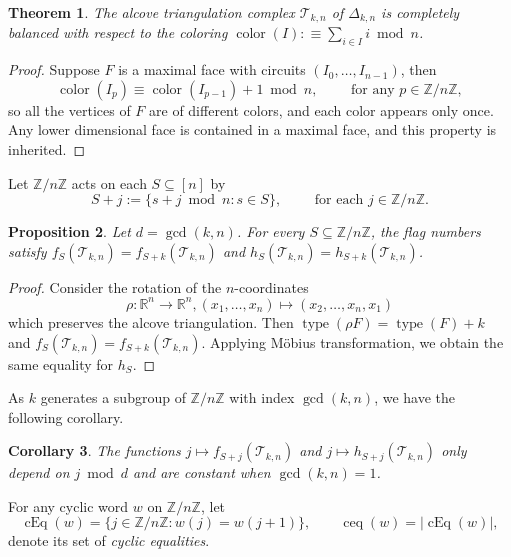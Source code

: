 \documentclass[10pt,a4paper]{amsart}
\theoremstyle{plain}
\newtheorem{theorem}{Theorem}[section]
\newtheorem{proposition}[theorem]{Proposition}
\newtheorem{corollary}[theorem]{Corollary}
\theoremstyle{definition}
\newcommand{\Z}{\mathbb{Z}}
\newcommand{\R}{\mathbb{R}}
\newcommand{\hyp}{\Delta_{k,n}}
\newcommand{\Tri}{\mathcal{T}_{k,n}}
\DeclareMathOperator{\typ}{type}
\DeclareMathOperator{\cEq}{cEq}
\DeclareMathOperator{\col}{color}
\DeclareMathOperator{\ceq}{ceq}
\begin{document}
\begin{theorem}\label{thm:coloring}
	The alcove triangulation complex $ \Tri $ of $ \hyp $
	is completely balanced with respect to the coloring $
		\col(I):\equiv \sum_{i \in I} i \bmod n$.
\end{theorem}

\begin{proof}
	Suppose $F$ is a maximal face with circuits $(I_0,\dots,I_{n-1})$, then \[\col(I_{p}) \equiv \col(I_{p-1}) + 1 \bmod n, \qquad \text{ for any }p \in \Z/n\Z, \] so all the vertices of $F$ are of different colors, and each color appears only once. Any lower dimensional face is
    contained in a maximal face, and this property is inherited.
\end{proof}

Let $ \Z/n\Z $ acts on each $ S \subseteq [n] $ by
\begin{equation}
	S + j:= \{s + j \bmod n \colon s \in S\}, \qquad \text{ for each } j \in \Z/n\Z.
\end{equation}
\begin{proposition}
	Let $d = \gcd(k,n)$. For every $S \subseteq \Z/n\Z$, the flag numbers satisfy $f_S(\Tri) = f_{S+k}(\Tri)$ and $h_S(\Tri) = h_{S+k}(\Tri)$.
\end{proposition}
\begin{proof}
	Consider the rotation of the $n$-coordinates
	\[
		\rho: \R^n \to \R^n, (x_1,\dots,x_n) \mapsto
		(x_2,\dots,x_{n},x_1)
	\]
	which preserves the alcove triangulation. Then $\typ(\rho F) = \typ(F) + k$ and $f_S(\Tri) = f_{S+k}(\Tri)$.
	Applying M\"obius transformation, we obtain the same equality for $h_S$.
\end{proof}

As $k$ generates a subgroup of $\Z/n\Z$ with index $\gcd(k,n)$, we have the following corollary.
\begin{corollary}\label{cor:gcd}
	The functions $j \mapsto f_{S+j}(\Tri)$ and $j \mapsto h_{S+j}(\Tri)$ only depend on $j \bmod d$ and
	are constant when $\gcd(k,n)=1$.
\end{corollary}

For any cyclic word $w$ on $\Z/n\Z$, let
\begin{equation}
	\cEq(w)  =\{j\in\Z/n\Z:w(j)=w(j+1)\}, \qquad \ceq(w) = |\cEq(w)|,
\end{equation}
denote its set of \emph{cyclic equalities}.
\end{document}
